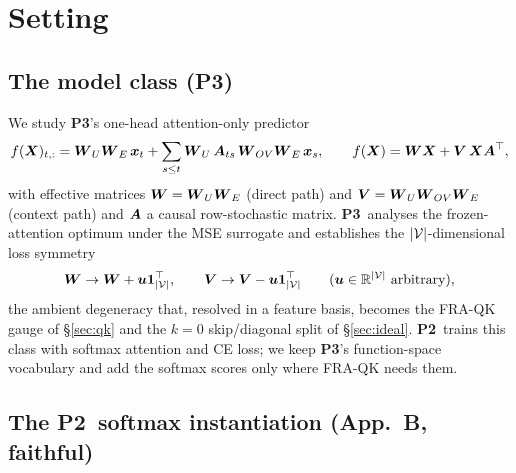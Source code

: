 \documentclass{article}
\newcommand{\Ptwo}{\textbf{P2}}
\newcommand{\Pthree}{\textbf{P3}}
\begin{document}
\section{Setting}\label{sec:setting}

\subsection{The model class (\Pthree)}

We study \Pthree's one-head attention-only predictor
\begin{equation}\label{eq:transformer}
f(\boldsymbol{X})_{t,:}=\boldsymbol{W}_U\boldsymbol{W}_E\,\boldsymbol{x}_t+\sum_{s\le t}\boldsymbol{W}_U\,\boldsymbol{A}_{ts}\,\boldsymbol{W}_{OV}\boldsymbol{W}_E\,\boldsymbol{x}_s,
\qquad f(\boldsymbol{X})=\boldsymbol{W}\boldsymbol{X}+\boldsymbol{V}\,\boldsymbol{X}\boldsymbol{A}^\top,
\end{equation}
with effective matrices $\boldsymbol{W}=\boldsymbol{W}_U\boldsymbol{W}_E$ (direct path) and $\boldsymbol{V}=\boldsymbol{W}_U\boldsymbol{W}_{OV}\boldsymbol{W}_E$ (context
path) and $\boldsymbol{A}$ a causal row-stochastic matrix. \Pthree\ analyses the
frozen-attention optimum under the MSE surrogate and establishes the
${\vert \mathcal{V}\vert}$-dimensional loss symmetry
\begin{equation}\label{eq:p3-symmetry}
\boldsymbol{W}\to\boldsymbol{W}+\boldsymbol{u}\boldsymbol{1}_{{\vert \mathcal{V}\vert}}^\top,\qquad \boldsymbol{V}\to\boldsymbol{V}-\boldsymbol{u}\boldsymbol{1}_{{\vert \mathcal{V}\vert}}^\top
\qquad(\boldsymbol{u}\in\mathbb{R}^{{\vert \mathcal{V}\vert}}\ \text{arbitrary}),
\end{equation}
the ambient degeneracy that, resolved in a feature basis, becomes the FRA-QK gauge
of \S\ref{sec:qk} and the $k{=}0$ skip/diagonal split of \S\ref{sec:ideal}. \Ptwo\
trains this class with softmax attention and CE loss; we keep \Pthree's
function-space vocabulary and add the softmax scores only where FRA-QK needs them.

\subsection{The \Ptwo\ softmax instantiation (App.\ B, faithful)}
\end{document}
